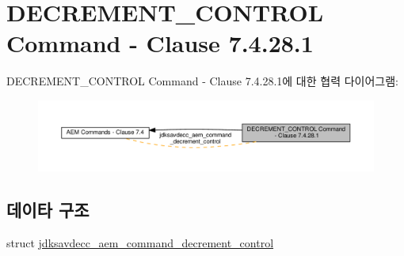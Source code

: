 \hypertarget{group__command__decrement__control}{}\section{D\+E\+C\+R\+E\+M\+E\+N\+T\+\_\+\+C\+O\+N\+T\+R\+OL Command -\/ Clause 7.4.28.1}
\label{group__command__decrement__control}
D\+E\+C\+R\+E\+M\+E\+N\+T\+\_\+\+C\+O\+N\+T\+R\+OL Command -\/ Clause 7.4.28.1에 대한 협력 다이어그램\+:
\nopagebreak
\begin{figure}[H]
\begin{center}
\leavevmode
\includegraphics[width=350pt]{group__command__decrement__control}
\end{center}
\end{figure}
\subsection*{데이타 구조}
\begin{DoxyCompactItemize}
\item 
struct \hyperlink{structjdksavdecc__aem__command__decrement__control}{jdksavdecc\+\_\+aem\+\_\+command\+\_\+decrement\+\_\+control}
\end{DoxyCompactItemize}
